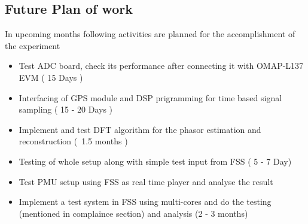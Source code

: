 \subsection*{Future Plan of work}
In upcoming months following activities are planned for the accomplishment of the experiment
\begin{itemize}
\item Test ADC board, check its performance after connecting it with OMAP-L137 EVM ( 15 Days )
\item Interfacing of GPS module and DSP prigramming for time based signal sampling ( 15 - 20 Days )
\item Implement and test DFT algorithm for the phasor estimation and reconstruction (~1.5 months )
\item Testing of whole setup along with simple test input from FSS ( 5 - 7 Day)
\item Test PMU setup using FSS as real time player and analyse the result
\item Implement a test system in FSS using multi-cores and do the testing (mentioned in complaince section) and analysis (2 - 3 months)
\end{itemize}
